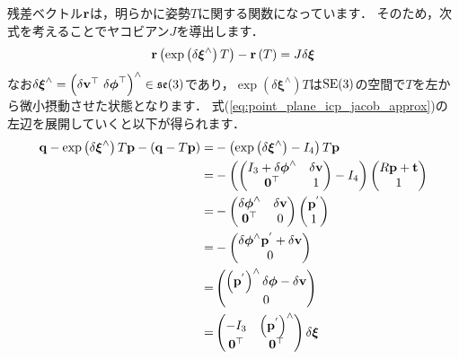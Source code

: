 残差ベクトル${\bf r}$は，明らかに姿勢$T$に関する関数になっています．
そのため，次式を考えることでヤコビアン$J$を導出します．
%
\begin{align}
  {\bf r} \left( \exp \left( \delta \boldsymbol \xi^{\wedge} \right) T \right) - {\bf r} \left( T \right) =
  J \delta \boldsymbol \xi
  \label{eq:point_plane_icp_jacob_approx}
\end{align}
%
なお$\delta \boldsymbol \xi^{\wedge} = \left( \delta {\bf v}^{\top} ~ \delta \boldsymbol \phi^{\top} \right)^{\wedge} \in \mathfrak{se}(3)$であり，$\exp \left( \delta \boldsymbol \xi^{\wedge} \right) T$は${\rm SE}(3)$の空間で$T$を左から微小摂動させた状態となります．
式(\ref{eq:point_plane_icp_jacob_approx})の左辺を展開していくと以下が得られます．
%
\begin{align}
  \begin{split}
    {\bf q} - \exp \left( \delta \boldsymbol \xi^{\wedge} \right) T {\bf p} - \left( {\bf q} - T {\bf p} \right)
    = & - \left( \exp \left( \delta \boldsymbol \xi^{\wedge} \right) - I_{4} \right) T {\bf p} \\
    = & - \left( \left( \begin{matrix} I_{3} + \delta \boldsymbol \phi^{\wedge} & \delta {\bf v} \\ {\bf 0}^{\top} & 1 \end{matrix} \right) - I_{4} \right) \left( \begin{matrix} R {\bf p} + {\bf t} \\ 1 \end{matrix} \right) \\
    = & - \left( \begin{matrix} \delta \boldsymbol \phi^{\wedge} & \delta {\bf v} \\ {\bf 0}^{\top} & 0 \end{matrix} \right) \left( \begin{matrix} {\bf p}^{'} \\ 1 \end{matrix} \right) \\
     = & - \left( \begin{matrix} \delta \boldsymbol \phi^{\wedge} {\bf p}^{'} + \delta {\bf v} \\ 0 \end{matrix} \right) \\
     = & \left( \begin{matrix} \left( {\bf p}^{'} \right)^{\wedge} \delta \boldsymbol \phi - \delta {\bf v} \\ 0 \end{matrix} \right) \\
     = & \left( \begin{matrix} -I_{3} & \left( {\bf p}^{'} \right)^{\wedge} \\ {\bf 0}^{\top} & {\bf 0}^{\top} \end{matrix} \right) \delta \boldsymbol \xi
  \end{split}
\end{align}
